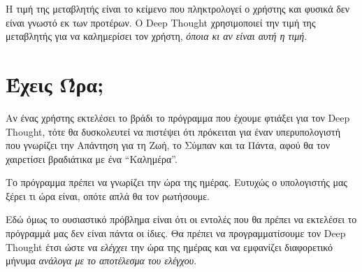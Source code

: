 \documentclass[a4paper,11pt,oneside]{book}
\begin{document}
Η τιμή της μεταβλητής  είναι το κείμενο που πληκτρολογεί ο χρήστης και φυσικά δεν είναι γνωστό εκ των προτέρων. O Deep Thought χρησιμοποιεί την τιμή της μεταβλητής  για να καλημερίσει τον χρήστη, \emph{όποια κι αν είναι αυτή η τιμή}.



\section{Έχεις Ώρα;}

\begin{question}
Αν ένας χρήστης εκτελέσει το βράδι το πρόγραμμα που έχουμε φτιάξει για τον Deep Thought, τότε θα δυσκολευτεί να πιστέψει ότι πρόκειται για έναν υπερυπολογιστή που γνωρίζει την Απάντηση για τη Ζωή, το Σύμπαν και τα Πάντα, αφού θα τον χαιρετίσει βραδιάτικα με ένα ``Καλημέρα''. 
\end{question}

Tο πρόγραμμα πρέπει να γνωρίζει την ώρα της ημέρας. Ευτυχώς ο υπολογιστής μας ξέρει τι ώρα είναι, οπότε απλά θα τον ρωτήσουμε.


Εδώ όμως το ουσιαστικό πρόβλημα είναι ότι οι εντολές που θα πρέπει να εκτελέσει το πρόγραμμά μας δεν είναι πάντα οι ίδιες.  Θα πρέπει να προγραμματίσουμε τον Deep Thought έτσι ώστε να \emph{ελέγχει} την ώρα της ημέρας και να εμφανίζει διαφορετικό μήνυμα \emph{ανάλογα με το αποτέλεσμα του ελέγχου}. 

\end{document}
